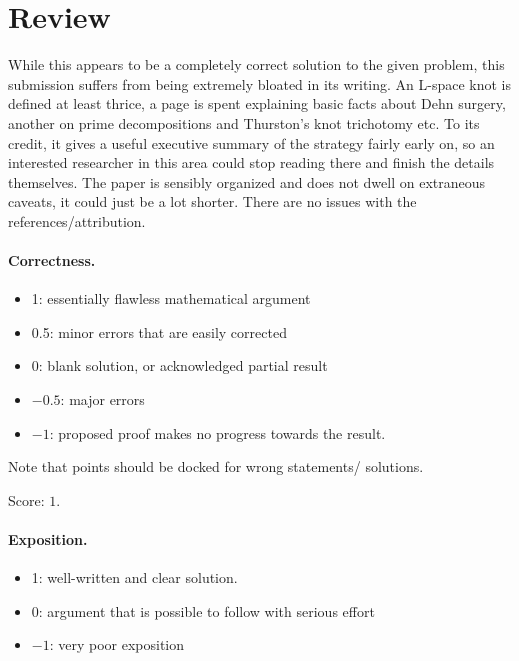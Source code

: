 \documentclass[11pt]{article}
\theoremstyle{definition}
\theoremstyle{remark}
\begin{document}
\maketitle

\section{Review}

While this appears to be a completely correct solution to the given problem, this submission suffers from being extremely bloated in its writing. An L-space knot is defined at least thrice, a page is spent explaining basic facts about Dehn surgery, another on prime decompositions and Thurston's knot trichotomy etc. To its credit, it gives a useful executive summary of the strategy fairly early on, so an interested researcher in this area could stop reading there and finish the details themselves. The paper is sensibly organized and does not dwell on extraneous caveats, it could just be a lot shorter. There are no issues with the references/attribution.


\paragraph{Correctness.}
\begin{itemize}
	\item  1: essentially flawless mathematical argument
	\item  0.5: minor errors that are easily corrected
	\item  0: blank solution, or acknowledged partial result
	\item  $-0.5$: major errors
	\item  $-1$: proposed proof makes no progress towards the result.
\end{itemize}
Note that points should be docked for wrong statements/ solutions.

\noindent Score: $1$. 

\paragraph{Exposition.}
\begin{itemize}
	\item  1: well-written and clear solution.
	\item  0: argument that is possible to follow with serious effort
	\item  $-1$: very poor exposition
\end{itemize}
\end{document}
